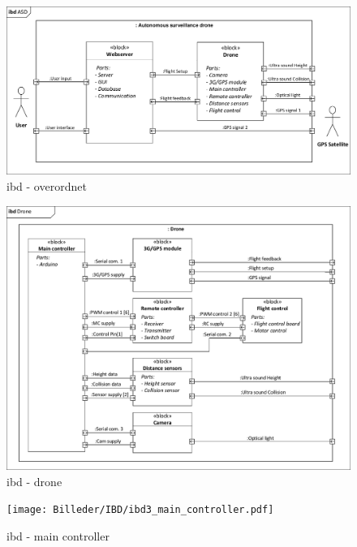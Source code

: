 \begin{figure}[H]
\centering
\includegraphics[width=1\textwidth]{Billeder/IBD/ibd1_overordnet.pdf}
\caption{ibd - overordnet}
\label{fig:ibd_overordnet}
\end{figure}

\begin{figure}[H]
\centering
\includegraphics[width=1\textwidth]{Billeder/IBD/ibd2_drone.pdf}
\caption{ibd - drone}
\label{fig:ibd_drone}
\end{figure}

\begin{figure}[H]
\centering
\texttt{[image: Billeder/IBD/ibd3\_main\_controller.pdf]}
\caption{ibd - main controller}
\label{fig:ibd_maincontroller}
\end{figure}

